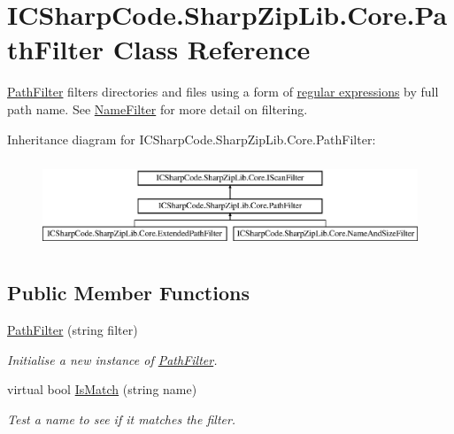 \hypertarget{class_i_c_sharp_code_1_1_sharp_zip_lib_1_1_core_1_1_path_filter}{}\section{I\+C\+Sharp\+Code.\+Sharp\+Zip\+Lib.\+Core.\+Path\+Filter Class Reference}
\label{class_i_c_sharp_code_1_1_sharp_zip_lib_1_1_core_1_1_path_filter}


\hyperlink{class_i_c_sharp_code_1_1_sharp_zip_lib_1_1_core_1_1_path_filter}{Path\+Filter} filters directories and files using a form of \hyperlink{}{regular expressions} by full path name. See \hyperlink{class_i_c_sharp_code_1_1_sharp_zip_lib_1_1_core_1_1_name_filter}{Name\+Filter} for more detail on filtering.  


Inheritance diagram for I\+C\+Sharp\+Code.\+Sharp\+Zip\+Lib.\+Core.\+Path\+Filter\+:\begin{figure}[H]
\begin{center}
\leavevmode
\includegraphics[height=2.675159cm]{class_i_c_sharp_code_1_1_sharp_zip_lib_1_1_core_1_1_path_filter}
\end{center}
\end{figure}
\subsection*{Public Member Functions}
\begin{DoxyCompactItemize}
\item 
\hyperlink{class_i_c_sharp_code_1_1_sharp_zip_lib_1_1_core_1_1_path_filter_a361b2f89d26eb94675e7b9d50d31d418}{Path\+Filter} (string filter)
\begin{DoxyCompactList}\small\item\em Initialise a new instance of \hyperlink{class_i_c_sharp_code_1_1_sharp_zip_lib_1_1_core_1_1_path_filter}{Path\+Filter}. \end{DoxyCompactList}\item 
virtual bool \hyperlink{class_i_c_sharp_code_1_1_sharp_zip_lib_1_1_core_1_1_path_filter_a9c140b289a97036cdfe4eb55e1b5d5b8}{Is\+Match} (string name)
\begin{DoxyCompactList}\small\item\em Test a name to see if it matches the filter. \end{DoxyCompactList}\end{DoxyCompactItemize}


